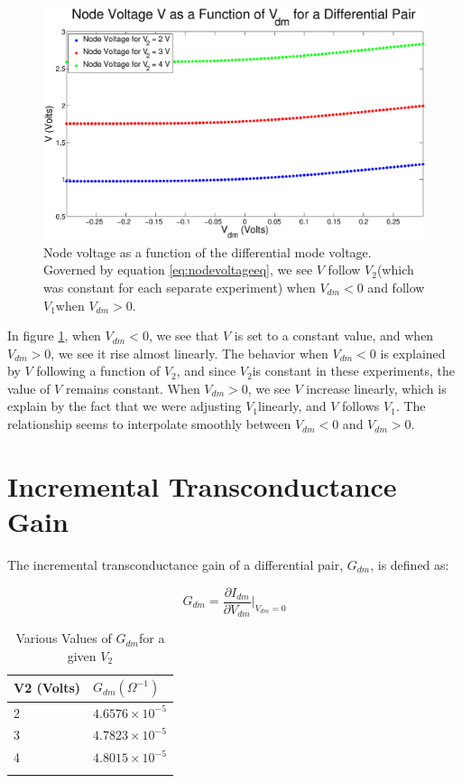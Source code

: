 \documentclass{article}
\newcommand{\Vtwo}{{$V_{2}$}}
\newcommand{\Vone}{{$V_{1}$}}
\newcommand{\gdm}{{$G_{dm}$}}
\begin{document}
\begin{figure}[H]
\centering
\includegraphics[width=\linewidth]{./Figures/NodeVoltageWeakInversion.eps}
\caption{Node voltage as a function of the differential mode voltage. Governed by equation \ref{eq:nodevoltageeq}, we see $V$ follow \Vtwo (which was constant for each separate experiment) when $V_{dm} < 0$ and follow \Vone when $V_{dm} > 0$.}
\label{fig:nodevoltageWI}
\end{figure}

In figure \ref{fig:nodevoltageWI}, when $V_{dm} < 0$, we see that $V$ is set to a constant value, and when $V_{dm} > 0$, we see it rise almost linearly. The behavior when $V_{dm} < 0$ is explained by $V$ following a function of \Vtwo, and since \Vtwo is constant in these experiments, the value of $V$ remains constant. When $V_{dm} > 0$, we see $V$ increase linearly, which is explain by the fact that we were adjusting \Vone linearly, and $V$ follows \Vone. The relationship seems to interpolate smoothly between $V_{dm} < 0$ and $V_{dm} > 0$.


\section*{Incremental Transconductance Gain}

The incremental transconductance gain of a differential pair, \gdm, is defined as:

\begin{equation}
G_{dm} = \frac{\partial I_{dm}}{\partial V_{dm}}\bigg|_{V_{dm} = 0}
\label{eq:gdm}
\end{equation}

\begin{table}[h]
\begin{center}
    \begin{tabular}{ l | l  }
        V2 (Volts) & $G_{dm} (\Omega^{-1})$ \\
        \hline
        2 & $ 4.6576 \times 10^{-5}$ \\
        3 & $ 4.7823 \times 10^{-5}$ \\
        4 & $ 4.8015 \times 10^{-5}$ \\
        \label{tb:gdm}
    \end{tabular}
\end{center}
\caption{Various Values of \gdm for a given \Vtwo}
\end{table}
\end{document}

